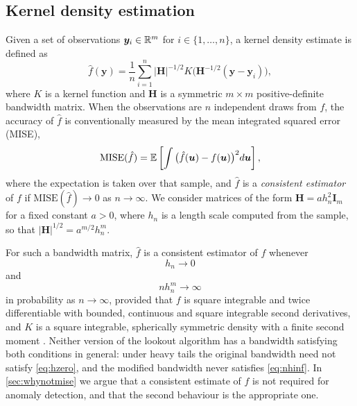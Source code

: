 \subsection{Kernel density estimation}

Given a set of observations $\bm{y}_{i} \in \mathbb{R}^m$ for $i \in \{1, \dots, n\}$, a kernel density estimate is defined as \citep{chacon2018multivariate}
\begin{equation}\label{eq:mkde}
  \hat{f}(\bm{y}) = \frac{1}{n} \sum_{i=1}^n |\bm{H}|^{-1/2} K\big(\bm{H}^{-1/2}(\bm{y} - \bm{y}_i)\big),
\end{equation}
where $K$ is a kernel function and $\bm{H}$ is a symmetric $m\times m$ positive-definite bandwidth matrix. When the observations are $n$ independent draws from $f$, the accuracy of $\hat{f}$ is conventionally measured by the mean integrated squared error (MISE),
\begin{equation}\label{eq:mise}
  \text{MISE}(\hat{f}) = \mathbb{E}\left[\int \big(\hat{f}(\bm{u}) - f(\bm{u})\big)^2 d\bm{u}\right],
\end{equation}
where the expectation is taken over that sample, and $\hat{f}$ is a \emph{consistent estimator} of $f$ if $\text{MISE}(\hat{f})\rightarrow 0$ as $n\rightarrow\infty$. We consider matrices of the form $\bm{H} = a h_n^2 \bm{I}_m$ for a fixed constant $a>0$, where $h_n$ is a length scale computed from the sample, so that $|\bm{H}|^{1/2}=a^{m/2}h_n^m$.

For such a bandwidth matrix, $\hat{f}$ is a consistent estimator of $f$ whenever
\begin{equation}\label{eq:hzero}
  h_n \to 0
\end{equation}
and
\begin{equation}\label{eq:nhinf}
  nh_n^m \to \infty
\end{equation}
in probability as $n\to\infty$, provided that $f$ is square integrable and twice differentiable with bounded, continuous and square integrable second derivatives, and $K$ is a square integrable, spherically symmetric density with a finite second moment \citep[pp.~31--37]{chacon2018multivariate}. Neither version of the lookout algorithm has a bandwidth satisfying both conditions in general: under heavy tails the original bandwidth need not satisfy \eqref{eq:hzero}, and the modified bandwidth never satisfies \eqref{eq:nhinf}. In \cref{sec:whynotmise} we argue that a consistent estimate of $f$ is not required for anomaly detection, and that the second behaviour is the appropriate one.

